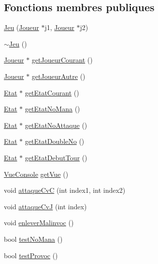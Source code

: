 \subsection*{Fonctions membres publiques}
\begin{DoxyCompactItemize}
\item 
\hyperlink{class_jeu_a3033d02a2ec0e17b170b0735393d716e}{Jeu} (\hyperlink{class_joueur}{Joueur} $\ast$j1, \hyperlink{class_joueur}{Joueur} $\ast$j2)
\item 
\hyperlink{class_jeu_a9cd19e73df169d7f09397be61ba8548c}{$\sim$\-Jeu} ()
\item 
\hyperlink{class_joueur}{Joueur} $\ast$ \hyperlink{class_jeu_a676f11e6bda0cde27f128e90cbaae765}{get\-Joueur\-Courant} ()
\item 
\hyperlink{class_joueur}{Joueur} $\ast$ \hyperlink{class_jeu_aeaa0f199d6a1c9271a49b226159dd1ca}{get\-Joueur\-Autre} ()
\item 
\hyperlink{class_etat}{Etat} $\ast$ \hyperlink{class_jeu_a6a84bec16f8075c1c9b867096dfc2b06}{get\-Etat\-Courant} ()
\item 
\hyperlink{class_etat}{Etat} $\ast$ \hyperlink{class_jeu_a6af6b2d0bd215cde1d63dbe3e799b291}{get\-Etat\-No\-Mana} ()
\item 
\hyperlink{class_etat}{Etat} $\ast$ \hyperlink{class_jeu_a4935a721a0e230cebae3905c78f3721f}{get\-Etat\-No\-Attaque} ()
\item 
\hyperlink{class_etat}{Etat} $\ast$ \hyperlink{class_jeu_a94fc4b05a1d532795b4c8a5d0fec4003}{get\-Etat\-Double\-No} ()
\item 
\hyperlink{class_etat}{Etat} $\ast$ \hyperlink{class_jeu_a8ae205a6a9d95ec5bed20e2fdf5c74a7}{get\-Etat\-Debut\-Tour} ()
\item 
\hyperlink{class_vue_console}{Vue\-Console} \hyperlink{class_jeu_a6a98e2284176a68e9096a331d7da75e7}{get\-Vue} ()
\item 
void \hyperlink{class_jeu_a86087ecade936bff6bad82eb024ba6bf}{attaque\-Cv\-C} (int index1, int index2)
\item 
void \hyperlink{class_jeu_a81b8b7bc79f9df1b1f3c557e04e8c634}{attaque\-Cv\-J} (int index)
\item 
void \hyperlink{class_jeu_a43c11cf6d659b78dd957cfa65d6d5547}{enlever\-Malinvoc} ()
\item 
bool \hyperlink{class_jeu_abbbc59a98fe8296456ddc112faa2b66b}{test\-No\-Mana} ()
\item 
bool \hyperlink{class_jeu_a391aae052833ebc367a660f4d3a7df29}{test\-Provoc} ()
\item 

\end{DoxyCompactItemize}
